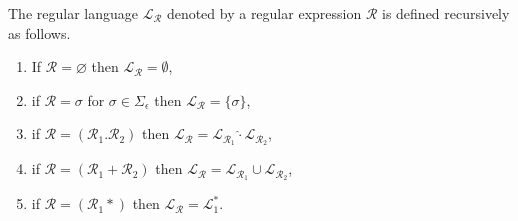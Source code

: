 \begin{definition}
	The regular language $\mathcal{L}_\mathcal{R}$ denoted by a regular
	expression $\mathcal{R}$ is defined recursively as follows.
	\begin{enumerate}
		\item If $\mathcal{R} = \varnothing$ then $\mathcal{L}_\mathcal{R} =
			\emptyset$,
		\item if $\mathcal{R} = \sigma$ for $\sigma \in \Sigma_\epsilon$
			then $\mathcal{L}_\mathcal{R} = \{ \sigma \}$,
		\item if $\mathcal{R} = (\mathcal{R}_1.\mathcal{R}_2)$ then
			$\mathcal{L}_\mathcal{R} = \mathcal{L}_{\mathcal{R}_1}
			\hat{\cdot} \mathcal{L}_{\mathcal{R}_2}$,
		\item if $\mathcal{R} = (\mathcal{R}_1+\mathcal{R}_2)$ then
			$\mathcal{L}_\mathcal{R} = \mathcal{L}_{\mathcal{R}_1}
			\cup \mathcal{L}_{\mathcal{R}_2}$,
		\item if $\mathcal{R} = (\mathcal{R}_1*)$ then
			$\mathcal{L}_\mathcal{R} = \mathcal{L}_1^*$.
	\end{enumerate}
\end{definition}


